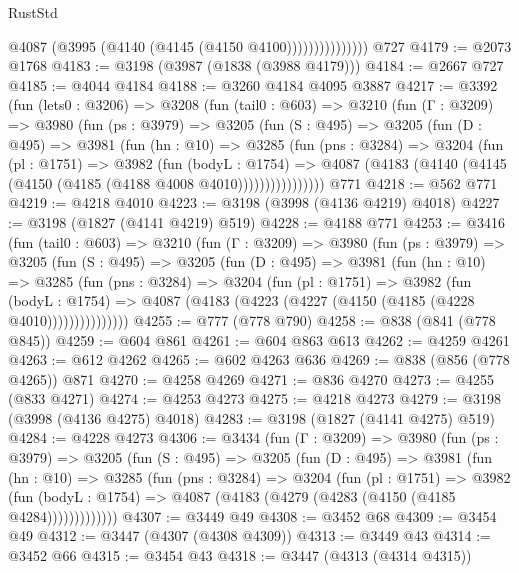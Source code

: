 \begin{lexlean}{RustStd}
\begin{coremodule}
                        @4087 (@3995 (@4140 (@4145 (@4150 @4100)))))))))))))))
    @727
@4179 := @2073 @1768
@4183 := @3198 (@3987 (@1838 (@3988 @4179)))
@4184 := @2667 @727
@4185 := @4044 @4184
@4188 := @3260 @4184 @4095 @3887
@4217 := @3392
    (fun (lets0 : @3206) =>
    @3208
      (fun (tail0 : @603) =>
      @3210
        (fun (Γ : @3209) =>
        @3980
          (fun (ps : @3979) =>
          @3205
            (fun (S : @495) =>
            @3205
              (fun (D : @495) =>
              @3981
                (fun (hn : @10) =>
                @3285
                  (fun (pns : @3284) =>
                  @3204
                    (fun (pl : @1751) =>
                    @3982
                      (fun (bodyL : @1754) =>
                      @4087 (@4183 (@4140 (@4145 (@4150 (@4185 (@4188 @4008 @4010))))))))))))))))
    @771
@4218 := @562 @771
@4219 := @4218 @4010
@4223 := @3198 (@3998 (@4136 @4219) @4018)
@4227 := @3198 (@1827 (@4141 @4219) @519)
@4228 := @4188 @771
@4253 := @3416
    (fun (tail0 : @603) =>
    @3210
      (fun (Γ : @3209) =>
      @3980
        (fun (ps : @3979) =>
        @3205
          (fun (S : @495) =>
          @3205
            (fun (D : @495) =>
            @3981
              (fun (hn : @10) =>
              @3285
                (fun (pns : @3284) =>
                @3204
                  (fun (pl : @1751) =>
                  @3982
                    (fun (bodyL : @1754) =>
                    @4087 (@4183 (@4223 (@4227 (@4150 (@4185 (@4228 @4010)))))))))))))))
@4255 := @777 (@778 @790)
@4258 := @838 (@841 (@778 @845))
@4259 := @604 @861
@4261 := @604 @863 @613
@4262 := @4259 @4261
@4263 := @612 @4262
@4265 := @602 @4263 @636
@4269 := @838 (@856 (@778 @4265)) @871
@4270 := @4258 @4269
@4271 := @836 @4270
@4273 := @4255 (@833 @4271)
@4274 := @4253 @4273
@4275 := @4218 @4273
@4279 := @3198 (@3998 (@4136 @4275) @4018)
@4283 := @3198 (@1827 (@4141 @4275) @519)
@4284 := @4228 @4273
@4306 := @3434
    (fun (Γ : @3209) =>
    @3980
      (fun (ps : @3979) =>
      @3205
        (fun (S : @495) =>
        @3205
          (fun (D : @495) =>
          @3981
            (fun (hn : @10) =>
            @3285
              (fun (pns : @3284) =>
              @3204
                (fun (pl : @1751) =>
                @3982
                  (fun (bodyL : @1754) =>
                  @4087 (@4183 (@4279 (@4283 (@4150 (@4185 @4284)))))))))))))
@4307 := @3449 @49
@4308 := @3452 @68
@4309 := @3454 @49
@4312 := @3447 (@4307 (@4308 @4309))
@4313 := @3449 @43
@4314 := @3452 @66
@4315 := @3454 @43
@4318 := @3447 (@4313 (@4314 @4315))

\end{coremodule}
\end{lexlean}
